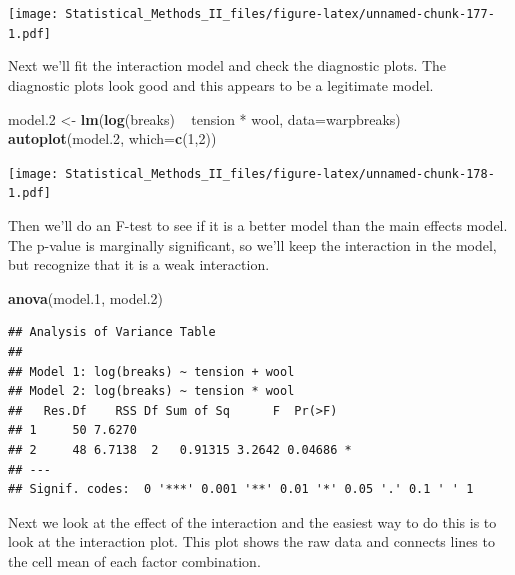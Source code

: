 \documentclass[]{book}
\newenvironment{Shaded}{\begin{snugshade}}{\end{snugshade}}
\newcommand{\KeywordTok}[1]{\textcolor[rgb]{0.13,0.29,0.53}{\textbf{{#1}}}}
\newcommand{\DataTypeTok}[1]{\textcolor[rgb]{0.13,0.29,0.53}{{#1}}}
\newcommand{\DecValTok}[1]{\textcolor[rgb]{0.00,0.00,0.81}{{#1}}}
\newcommand{\FloatTok}[1]{\textcolor[rgb]{0.00,0.00,0.81}{{#1}}}
\newcommand{\StringTok}[1]{\textcolor[rgb]{0.31,0.60,0.02}{{#1}}}
\newcommand{\NormalTok}[1]{{#1}}
\theoremstyle{definition}
\theoremstyle{definition}
\theoremstyle{remark}
\begin{document}
\texttt{[image: Statistical\_Methods\_II\_files/figure-latex/unnamed-chunk-177-1.pdf]}

Next we'll fit the interaction model and check the diagnostic plots. The
diagnostic plots look good and this appears to be a legitimate model.

\begin{Shaded}
\begin{Highlighting}[]
\NormalTok{model}\FloatTok{.2} \NormalTok{<-}\StringTok{ }\KeywordTok{lm}\NormalTok{(}\KeywordTok{log}\NormalTok{(breaks) ~}\StringTok{ }\NormalTok{tension *}\StringTok{ }\NormalTok{wool, }\DataTypeTok{data=}\NormalTok{warpbreaks)}
\KeywordTok{autoplot}\NormalTok{(model}\FloatTok{.2}\NormalTok{, }\DataTypeTok{which=}\KeywordTok{c}\NormalTok{(}\DecValTok{1}\NormalTok{,}\DecValTok{2}\NormalTok{))}
\end{Highlighting}
\end{Shaded}

\texttt{[image: Statistical\_Methods\_II\_files/figure-latex/unnamed-chunk-178-1.pdf]}

Then we'll do an F-test to see if it is a better model than the main
effects model. The p-value is marginally significant, so we'll keep the
interaction in the model, but recognize that it is a weak interaction.

\begin{Shaded}
\begin{Highlighting}[]
\KeywordTok{anova}\NormalTok{(model}\FloatTok{.1}\NormalTok{, model}\FloatTok{.2}\NormalTok{)}
\end{Highlighting}
\end{Shaded}

\begin{verbatim}
## Analysis of Variance Table
## 
## Model 1: log(breaks) ~ tension + wool
## Model 2: log(breaks) ~ tension * wool
##   Res.Df    RSS Df Sum of Sq      F  Pr(>F)  
## 1     50 7.6270                              
## 2     48 6.7138  2   0.91315 3.2642 0.04686 *
## ---
## Signif. codes:  0 '***' 0.001 '**' 0.01 '*' 0.05 '.' 0.1 ' ' 1
\end{verbatim}

Next we look at the effect of the interaction and the easiest way to do
this is to look at the interaction plot. This plot shows the raw data
and connects lines to the cell mean of each factor combination.

\begin{Shaded}
\end{Shaded}
\end{document}
